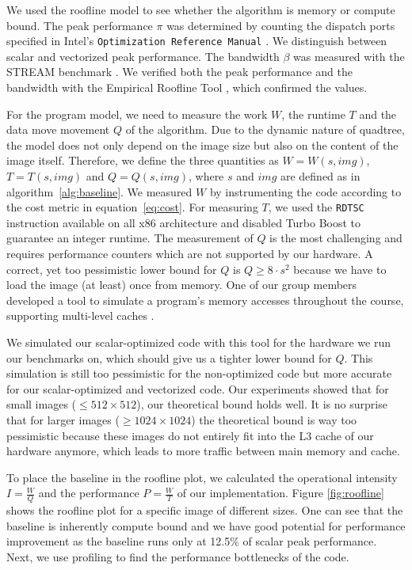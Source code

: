  We used the roofline model \cite{applying-roofline} to see
whether the algorithm is memory or compute bound. The peak performance $\pi$ was
determined by counting the dispatch ports specified in Intel's
\texttt{Optimization Reference Manual} \cite{intel-opt-manual}. We distinguish
between scalar and vectorized peak performance. The bandwidth $\beta$ was
measured with the STREAM benchmark \cite{stream}. We verified both the peak
performance and the bandwidth with the Empirical Roofline Tool \cite{ert}, which
confirmed the values.

For the program model, we need to measure the work $W$, the runtime $T$ and the
data move movement $Q$ of the algorithm. Due to the dynamic nature of quadtree,
the model does not only depend on the image size but also on the content of the
image itself. Therefore, we define the three quantities as $W=W(s, img)$,
$T=T(s, img)$ and $Q=Q(s, img)$, where $s$ and $img$ are defined as in
algorithm~\ref{alg:baseline}. We measured $W$ by instrumenting the code
according to the cost metric in equation~\eqref{eq:cost}. For measuring $T$, we
used the \texttt{RDTSC} instruction available on all x86 architecture and
disabled Turbo Boost to guarantee an integer runtime. The measurement of $Q$ is
the most challenging and requires performance counters which are not supported
by our hardware. A correct, yet too pessimistic lower bound for $Q$ is
$Q \geq 8 \cdot s^2$ because we have to load the image (at least) once from
memory. One of our group members developed a tool to simulate a program's memory
accesses throughout the course, supporting multi-level caches
\cite{github-cache}.

We simulated our scalar-optimized code with this tool for the hardware we run our benchmarks on,
which should give us a tighter lower bound for $Q$.
This simulation is still too pessimistic for the non-optimized code but more accurate for our scalar-optimized and vectorized code.
Our experiments showed that for small images ($\leq 512 \times 512$), our theoretical bound holds well.
It is no surprise that for larger images ($\geq 1024 \times 1024$) the theoretical bound is way too pessimistic
because these images do not entirely fit into the L3 cache of our hardware anymore, which leads to more traffic between main memory and cache.

To place the baseline in the roofline plot, we calculated the operational
intensity $I=\frac{W}{Q}$ and the performance $P=\frac{W}{T}$ of our
implementation. Figure \ref{fig:roofline} shows the roofline plot for a specific
image of different sizes. One can see that the baseline is inherently compute
bound and we have good potential for performance improvement as the baseline
runs only at 12.5\% of scalar peak performance. Next, we use profiling to find
the performance bottlenecks of the code.

